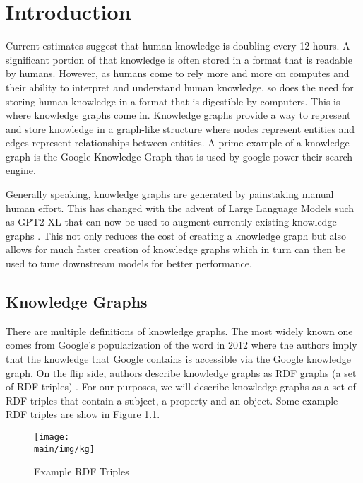 \documentclass[\main/thesis.tex]{subfiles}
\begin{document}
\chapter{Introduction}

Current estimates suggest that human knowledge is doubling every 12 hours. A significant portion
of that knowledge is often stored in a format that is readable by humans. However, as humans come 
to rely more and more on computes and their ability to interpret and understand human knowledge, so
does the need for storing human knowledge in a format that is digestible by computers. This is where 
knowledge graphs come in. Knowledge graphs provide a way to represent and store knowledge in a 
graph-like structure where nodes represent entities and edges represent relationships between
entities. A prime example of a knowledge graph is the Google Knowledge Graph that is used 
by google power their search engine. 


Generally speaking, knowledge graphs are generated by painstaking manual human effort. 
This has changed with the advent of Large Language Models such as GPT2-XL that can now be used to
augment currently existing knowledge graphs \cite{west_symbolic_2021}. This not only 
reduces the cost of creating a knowledge graph but also allows for much faster creation 
of knowledge graphs which in turn can then be used to tune downstream models for better performance.
 \cite{noauthor_kelm_2021}


\section{Knowledge Graphs}\label{sec:knowledgeGraphs}

There are multiple definitions of knowledge graphs. The most widely known one comes from Google's 
popularization of the word in 2012 \cite{noauthor_introducing_2012} where the authors imply 
that the knowledge that Google contains is accessible via the Google knowledge graph. On the 
flip side, authors describe knowledge graphs as RDF graphs (a set of RDF triples) \cite{farber_linked_2017}. 
For our purposes, we will describe knowledge graphs as a set of RDF triples that contain 
a subject, a property and an object. Some example RDF triples are show in Figure \ref{fig:kg_fig}.

\begin{figure}
    \centering
    \texttt{[image: \\main/img/kg]}
    \caption[Example RDF Triples] {Example RDF Triples}
    \label{fig:kg_fig}
\end{figure}
\end{document}
